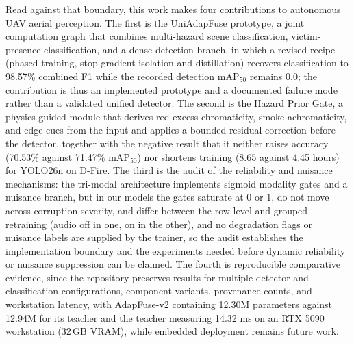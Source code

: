 \documentclass[journal]{IEEEtran}
\begin{document}
Read against that boundary, this work makes four contributions to autonomous UAV aerial perception. The first is the UniAdapFuse prototype, a joint computation graph that combines multi-hazard scene classification, victim-presence classification, and a dense detection branch, in which a revised recipe (phased training, stop-gradient isolation and distillation) recovers classification to 98.57\% combined F1 while the recorded detection $\mathrm{mAP}_{50}$ remains 0.0; the contribution is thus an implemented prototype and a documented failure mode rather than a validated unified detector. The second is the Hazard Prior Gate, a physics-guided module that derives red-excess chromaticity, smoke achromaticity, and edge cues from the input and applies a bounded residual correction before the detector, together with the negative result that it neither raises accuracy (70.53\% against 71.47\% $\mathrm{mAP}_{50}$) nor shortens training (8.65 against 4.45 hours) for YOLO26n on D-Fire. The third is the audit of the reliability and nuisance mechanisms: the tri-modal architecture implements sigmoid modality gates and a nuisance branch, but in our models the gates saturate at 0 or 1, do not move across corruption severity, and differ between the row-level and grouped retraining (audio off in one, on in the other), and no degradation flags or nuisance labels are supplied by the trainer, so the audit establishes the implementation boundary and the experiments needed before dynamic reliability or nuisance suppression can be claimed. The fourth is reproducible comparative evidence, since the repository preserves results for multiple detector and classification configurations, component variants, provenance counts, and workstation latency, with AdapFuse-v2 containing 12.30M parameters against 12.94M for its teacher and the teacher measuring 14.32 ms on an RTX 5090 workstation (32\,GB VRAM), while embedded deployment remains future work.
\end{document}
